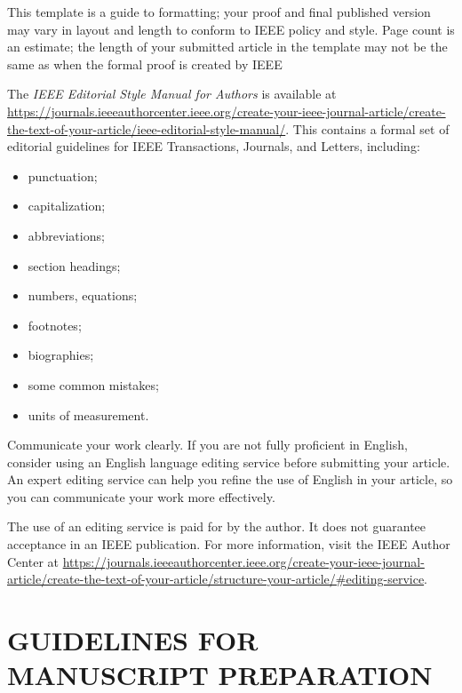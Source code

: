 \documentclass[correspondence]{IEEEtaes}
\begin{document}
This template is a guide to formatting; your proof and final published version may vary in layout and length to conform to IEEE policy and style. Page count is an estimate; the length of your submitted article in the template may not be the same as when the formal proof is created by IEEE

The {\it IEEE Editorial Style Manual for Authors} is available at \href{https://journals.ieeeauthorcenter.ieee.org/create-your-ieee-journal-article/create-the-text-of-your-article/ieee-editorial-style-manual/}{https://journals.ieeeauthorcenter.ieee.org/create-your-ieee-journal-article/create-the-text-of-your-article/ieee-editorial-style-manual/}. This contains a formal set of editorial guidelines for IEEE Transactions, Journals, and Letters, including:
\begin{itemize}
\item punctuation;
\item capitalization;
\item abbreviations;
\item section headings;
\item numbers, equations;
\item footnotes;
\item biographies;
\item some common mistakes;
\item units of measurement.
\end{itemize}

Communicate your work clearly. If you are not fully proficient in English, consider using an English language editing service before submitting your article. An expert editing service can help you refine the use of English in your article, so you can communicate your work more effectively.

The use of an editing service is paid for by the author. It does not guarantee acceptance in an IEEE publication. For more information, visit the IEEE Author Center at \href{https://journals.ieeeauthorcenter.ieee.org/create-your-ieee-journal-article/create-the-text-of-your-article/structure-your-article/\#editing-service}{https://journals.ieeeauthorcenter.ieee.org/create-your-ieee-journal-article/create-the-text-of-your-article/structure-your-article/\#editing-service}.

\section{GUIDELINES FOR MANUSCRIPT PREPARATION}
\end{document}
